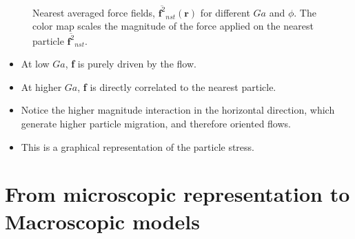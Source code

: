 \documentclass{sintefbeamer}
\newcommand{\nstavg}[1]{\overline{#1}_{nst}}
\begin{document}
\begin{frame}
\begin{figure}
    \caption{Nearest averaged force fields, $\nstavg{\textbf{f}^2}(\textbf{r})$ for different $Ga$ and $\phi$. 
    The color map scales the magnitude of the force applied on the nearest particle $\nstavg{\textbf{f}^2}$.}
  \end{figure}

\begin{itemize}
  \item At low $Ga$, \textbf{f} is purely driven by the flow. 
  \item At higher $Ga$, \textbf{f} is directly correlated to the nearest particle. 
  \item Notice the higher magnitude interaction in the horizontal direction, which generate higher particle migration, and therefore oriented flows.
  \item This is a graphical representation of the particle stress.  
\end{itemize}
\end{frame}

\section{From microscopic representation to Macroscopic models}
\end{document}
